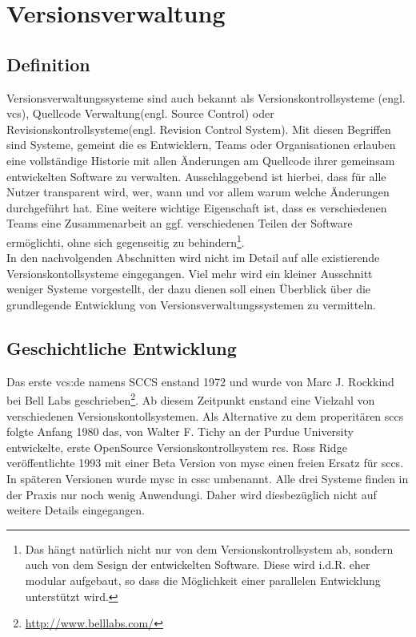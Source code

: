 \chapter{Versionsverwaltung}\label{cha:Versionsverwaltung}
\section{Definition}\label{sec:Definition}
Versionsverwaltungssysteme sind auch bekannt als Versionskontrollsysteme (engl.
\acrlong{vcs}), Quellcode Verwaltung(engl. Source Control) oder
Revisionskontrollsysteme(engl. Revision Control System). Mit diesen Begriffen
sind Systeme, gemeint die es Entwicklern, Teams oder Organisationen erlauben
eine vollständige Historie mit allen Änderungen am Quellcode ihrer gemeinsam
entwickelten Software zu verwalten. Ausschlaggebend ist hierbei, dass für alle
Nutzer transparent wird, wer, wann und vor allem warum welche Änderungen
durchgeführt hat. Eine weitere wichtige Eigenschaft ist, dass es verschiedenen
Teams eine Zusammenarbeit an ggf. verschiedenen Teilen der Software
ermöglichti, ohne sich gegenseitig zu behindern\footnote{\label{dev:1}Das hängt
natürlich nicht nur von dem Versionskontrollsystem ab, sondern auch von dem
Sesign der entwickelten Software.  Diese wird i.d.R. eher modular aufgebaut, so
dass die Möglichkeit einer parallelen Entwicklung unterstützt
wird.}.\cite[S.~381]{cd}\\

In den nachvolgenden Abschnitten wird nicht im Detail auf alle existierende
Versionskontollsysteme eingegangen. Viel mehr wird ein kleiner Ausschnitt
weniger Systeme vorgestellt, der dazu dienen soll einen Überblick über die
grundlegende Entwicklung von Versionsverwaltungssystemen zu vermitteln.

\section{Geschichtliche Entwicklung}\label{sec:GeschichtlicheEntwicklung}
Das erste \gls{vcs:de} namens SCCS enstand 1972 und wurde von Marc J.  Rockkind
bei Bell Labs
geschrieben\footnote{\url{http://www.belllabs.com/}}\cite[S.~382]{cd}. Ab
diesem Zeitpunkt enstand eine Vielzahl von verschiedenen
Versionskontollsystemen. Als Alternative zu dem properitären \acrshort{sccs}
folgte Anfang 1980 das, von Walter F. Tichy an der Purdue University
entwickelte, erste \acrlong{OpenSource} Versionskontrollsystem
\acrfull{rcs}\cite{paper:rcs,link:rcs}. Ross Ridge veröffentlichte 1993 mit
einer Beta Version von \acrshort{mysc} einen freien Ersatz für \acrshort{sccs}.
In späteren Versionen wurde \acrshort{mysc} in \acrfull{cssc}
umbenannt\cite{link:cssc,link:mysc}. Alle drei Systeme finden in der Praxis nur
noch wenig Anwendungi. Daher wird diesbezüglich nicht auf weitere Details
eingegangen.

